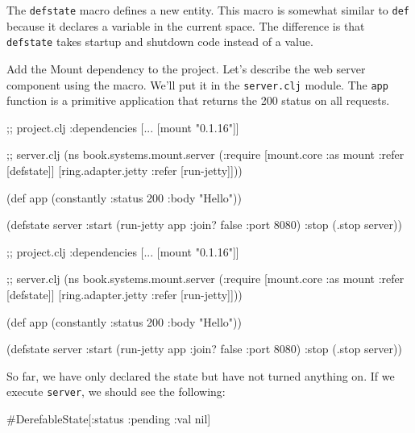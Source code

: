 
The \verb|defstate| macro defines a new entity. This macro is somewhat similar to \verb|def| because it declares a variable in the current space. The difference is that \verb|defstate| takes startup and shutdown code instead of a value.

Add the Mount dependency to the project. Let's describe the web server component using the macro. We'll put it in the \verb|server.clj| module. The \verb|app| function is a primitive application that returns the 200 status on all requests.

\ifnarrow

\begin{english}
  \begin{clojure}
;; project.clj
:dependencies [... [mount "0.1.16"]]

;; server.clj
(ns book.systems.mount.server
  (:require
   [mount.core :as mount
    :refer [defstate]]
   [ring.adapter.jetty
    :refer [run-jetty]]))

(def app (constantly
           {:status 200 :body "Hello"}))

(defstate server
  :start (run-jetty app
           {:join? false :port 8080})
  :stop (.stop server))
  \end{clojure}
\end{english}

\else

\begin{english}
  \begin{clojure}
;; project.clj
:dependencies [... [mount "0.1.16"]]

;; server.clj
(ns book.systems.mount.server
  (:require
   [mount.core :as mount :refer [defstate]]
   [ring.adapter.jetty :refer [run-jetty]]))

(def app (constantly {:status 200 :body "Hello"}))

(defstate server
  :start (run-jetty app {:join? false :port 8080})
  :stop (.stop server))
  \end{clojure}
\end{english}

\fi

So far, we have only declared the state but have not turned anything on. If we execute \verb|server|, we should see the following:

\ifnarrow

\begin{english}
  \begin{clojure}
#DerefableState[{:status :pending
                 :val nil}]
  \end{clojure}
\end{english}

